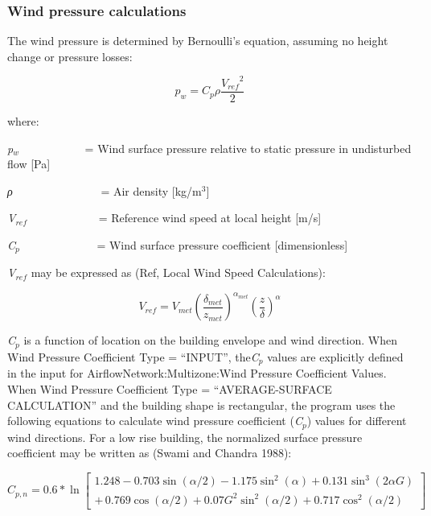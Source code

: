\subsubsection{Wind pressure calculations}\label{wind-pressure-calculations}

The wind pressure is determined by Bernoulli's equation, assuming no height change or pressure losses:

\begin{equation}
{p_w} = {C_p}\rho \frac{{{V_{ref}}^2}}{2}
\end{equation}

where:

\emph{p\(_{w}\)}~~~~~~~~~~~ = Wind surface pressure relative to static pressure in undisturbed flow {[}Pa{]}

\emph{ρ}~~~~~~~~~~~~~~~ = Air density {[}kg/m\(^{3}\){]}

\emph{V\(_{ref}\)}~~~~~~~~~~~~ = Reference wind speed at local height {[}m/s{]}

\emph{C\(_{p}\)}~~~~~~~~~~~~~ = Wind surface pressure coefficient {[}dimensionless{]}

\emph{V\(_{ref}\)} may be expressed as (Ref, Local Wind Speed Calculations):

\begin{equation}
{V_{ref}} = {V_{met}}{\left( {\frac{{{\delta_{met}}}}{{{z_{met}}}}} \right)^{{\alpha_{met}}}}{\left( {\frac{z}{\delta }} \right)^\alpha }
\end{equation}

\emph{C\(_{p}\)} is a function of location on the building envelope and wind direction. When Wind Pressure Coefficient Type = ``INPUT'', the\emph{C\(_{p}\)} values are explicitly defined in the input for AirflowNetwork:Multizone:Wind Pressure Coefficient Values. When Wind Pressure Coefficient Type = ``AVERAGE-SURFACE CALCULATION'' and the building shape is rectangular, the program uses the following equations to calculate wind pressure coefficient (\emph{C\(_{p}\)}) values for different wind directions. For a low rise building, the normalized surface pressure coefficient may be written as (Swami and Chandra 1988):

\begin{equation}
{C_{p,n}} = 0.6*\ln \left[ \begin{array}{l}1.248 - 0.703\sin (\alpha /2) - 1.175{\sin ^2}(\alpha ) + 0.131{\sin ^3}(2\alpha G)\\ + \,0.769\cos (\alpha /2) + 0.07{G^2}{\sin ^2}(\alpha /2) + 0.717{\cos ^2}(\alpha /2)\end{array} \right]
\end{equation}

